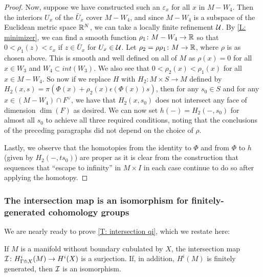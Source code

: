 \begin{proof}
	Now, suppose we have constructed such an $\varepsilon_x$ for all $x$ in $M - W_4$.
	Then the interiors $U_x$ of the $\bar U_x$ cover $M - W_4$, and since $M - W_4$ is a subspace of the Euclidean metric space $\mathbb{R}^N$, we can take a locally finite refinement $\mathcal{U}$.
	By \cref{L: minimizer}, we can find a smooth function $\rho_1 \colon M - W_4 \to \mathbb{R}$ so that $0<\rho_1(z)<\varepsilon_x$ if $z \in \bar U_x$ for $U_x \in \mathcal{U}$.
	Let $\rho_2 = \rho\rho_1 \colon M \to \mathbb{R}$, where $\rho$ is as chosen above.
	This is smooth and well defined on all of $M$ as $\rho(x) = 0$ for all $x \in W_3$ and $W_4 \subset int(W_3)$.
	We also see that $0<\rho_2(x)<\rho_1(x)$ for all $x \in M - W_4$.
	So now if we replace $H$ with $H_2 \colon M \times S \to M$ defined by $H_2(x,s) = \pi(\Phi(x)+\rho_2(x)\epsilon(\Phi(x)) s)$, then for any $s_0 \in S$ and for any $x \in (M - W_4) \cap F^\vee$, we have that $H_2(x,s_0)$ does not intersect any face of dimension $\dim(F)$ as desired.
	We can now set $h(-) = H_2(-,s_0)$ for almost all $s_0$ to achieve all three required conditions, noting that the conclusions of the preceding paragraphs did not depend on the choice of $\rho$.


	Lastly, we observe that the homotopies from the identity to $\Phi$ and from $\Phi$ to $h$ (given by $H_2(-,ts_0)$) are proper as it is clear from the construction that sequences that ``escape to infinity'' in $M \times I$ in each case continue to do so after applying the homotopy.
\end{proof}

\subsubsection{The intersection map is an isomorphism for finitely-generated cohomology groups}

We are nearly ready to prove \cref{T: intersection qi}, which we restate here:



\begin{theorem*}
	If $M$ is a manifold without boundary cubulated by $X$, the intersection map $\mathcal{I} \colon H^i_{\Gamma \pitchfork X}(M) \to H^i(X)$ is a surjection.
	If, in addition, $H^i(M)$ is finitely generated, then $\mathcal{I}$ is an isomorphism.
\end{theorem*}

